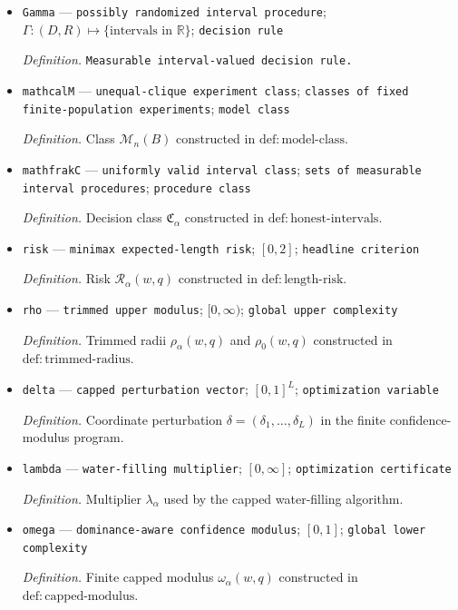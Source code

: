 \documentclass{article}
\begin{document}
\begin{itemize}
  \item \texttt{Gamma} --- \texttt{possibly randomized interval procedure}; \(\Gamma:(D,R)\mapsto\{\text{intervals in }\mathbb R\}\); \texttt{decision rule}
  \par\smallskip\noindent\emph{Definition.} \texttt{Measurable interval-\allowbreak{}valued decision rule.}
  \item \texttt{mathcalM} --- \texttt{unequal-\allowbreak{}clique experiment class}; \texttt{classes of fixed finite-\allowbreak{}population experiments}; \texttt{model class}
  \par\smallskip\noindent\emph{Definition.} Class \(\mathcal M_n(B)\) constructed in \(\mathrm{def{:}model\text{-}class}\).
  \item \texttt{mathfrakC} --- \texttt{uniformly valid interval class}; \texttt{sets of measurable interval procedures}; \texttt{procedure class}
  \par\smallskip\noindent\emph{Definition.} Decision class \(\mathfrak C_\alpha\) constructed in \(\mathrm{def{:}honest\text{-}intervals}\).
  \item \texttt{risk} --- \texttt{minimax expected-\allowbreak{}length risk}; \([0,2]\); \texttt{headline criterion}
  \par\smallskip\noindent\emph{Definition.} Risk \(\mathcal R_\alpha(w,q)\) constructed in \(\mathrm{def{:}length\text{-}risk}\).
  \item \texttt{rho} --- \texttt{trimmed upper modulus}; \([0,\infty)\); \texttt{global upper complexity}
  \par\smallskip\noindent\emph{Definition.} Trimmed radii \(\rho_\alpha(w,q)\) and \(\rho_0(w,q)\) constructed in \(\mathrm{def{:}trimmed\text{-}radius}\).
  \item \texttt{delta} --- \texttt{capped perturbation vector}; \([0,1]^L\); \texttt{optimization variable}
  \par\smallskip\noindent\emph{Definition.} Coordinate perturbation \(\delta=(\delta_1,\ldots,\delta_L)\) in the finite confidence-modulus program.
  \item \texttt{lambda} --- \texttt{water-\allowbreak{}filling multiplier}; \([0,\infty]\); \texttt{optimization certificate}
  \par\smallskip\noindent\emph{Definition.} Multiplier \(\lambda_\alpha\) used by the capped water-filling algorithm.
  \item \texttt{omega} --- \texttt{dominance-\allowbreak{}aware confidence modulus}; \([0,1]\); \texttt{global lower complexity}
  \par\smallskip\noindent\emph{Definition.} Finite capped modulus \(\omega_\alpha(w,q)\) constructed in \(\mathrm{def{:}capped\text{-}modulus}\).

\end{itemize}
\end{document}
